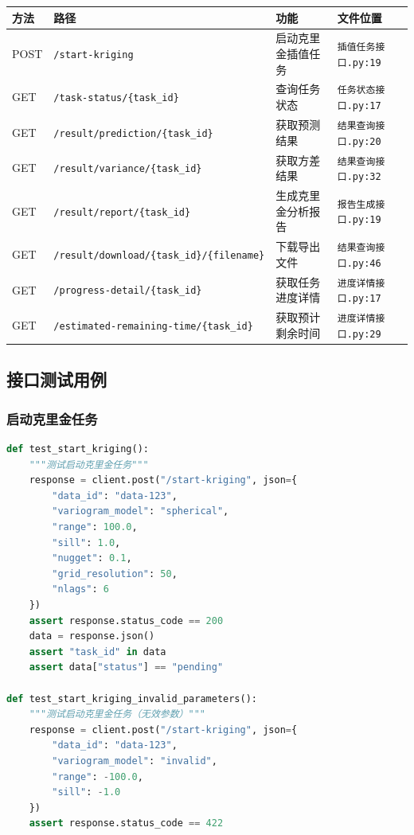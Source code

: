 \documentclass[12pt,a4paper,openany]{report}
\begin{document}
\begin{longtable}{|l|l|l|l|}
\hline
\textbf{方法} & \textbf{路径} & \textbf{功能} & \textbf{文件位置} \\
\hline
\endhead
POST & \texttt{/start-kriging} & 启动克里金插值任务 & \texttt{插值任务接口.py:19} \\
GET & \texttt{/task-status/\{task\_id\}} & 查询任务状态 & \texttt{任务状态接口.py:17} \\
GET & \texttt{/result/prediction/\{task\_id\}} & 获取预测结果 & \texttt{结果查询接口.py:20} \\
GET & \texttt{/result/variance/\{task\_id\}} & 获取方差结果 & \texttt{结果查询接口.py:32} \\
GET & \texttt{/result/report/\{task\_id\}} & 生成克里金分析报告 & \texttt{报告生成接口.py:19} \\
GET & \texttt{/result/download/\{task\_id\}/\{filename\}} & 下载导出文件 & \texttt{结果查询接口.py:46} \\
GET & \texttt{/progress-detail/\{task\_id\}} & 获取任务进度详情 & \texttt{进度详情接口.py:17} \\
GET & \texttt{/estimated-remaining-time/\{task\_id\}} & 获取预计剩余时间 & \texttt{进度详情接口.py:29} \\
\hline
\end{longtable}

\subsection{接口测试用例}

\subsubsection{启动克里金任务}

\begin{lstlisting}[language=Python, caption=启动克里金任务测试]
def test_start_kriging():
    """测试启动克里金任务"""
    response = client.post("/start-kriging", json={
        "data_id": "data-123",
        "variogram_model": "spherical",
        "range": 100.0,
        "sill": 1.0,
        "nugget": 0.1,
        "grid_resolution": 50,
        "nlags": 6
    })
    assert response.status_code == 200
    data = response.json()
    assert "task_id" in data
    assert data["status"] == "pending"

def test_start_kriging_invalid_parameters():
    """测试启动克里金任务（无效参数）"""
    response = client.post("/start-kriging", json={
        "data_id": "data-123",
        "variogram_model": "invalid",
        "range": -100.0,
        "sill": -1.0
    })
    assert response.status_code == 422
\end{lstlisting}
\end{document}
